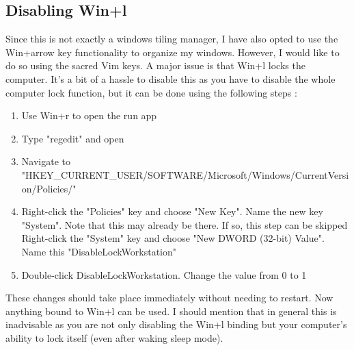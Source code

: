 \subsection{Disabling Win+l}
Since this is not exactly a windows tiling manager, I have also opted to use the
Win+arrow key functionality to organize my windows. However, I would like to do
so using the sacred Vim keys. A major issue is that Win+l locks the computer.
It's a bit of a hassle to disable this as you have to disable the whole computer
lock function, but it can be done using the following steps \cite{glenn2016disable}:
\begin{enumerate}
    \item Use Win+r to open the run app
    \item Type "regedit" and open
    \item Navigate to "HKEY\_CURRENT\_USER/SOFTWARE/Microsoft/Windows/CurrentVersion/Policies/"
    \item Right-click the "Policies" key and choose "New \trangle Key". Name the new
        key "System". Note that this may already be there. If so, this step can
        be skipped Right-click the "System" key and choose "New \trangle DWORD (32-bit)
        Value". Name this "DisableLockWorkstation"
    \item Double-click DisableLockWorkstation. Change the value from 0 to 1
\end{enumerate}
These changes should take place immediately without needing to restart. Now
anything bound to Win+l can be used. I should mention that in general this is
inadvisable as you are not only disabling the Win+l binding but your computer's
ability to lock itself (even after waking sleep mode).

